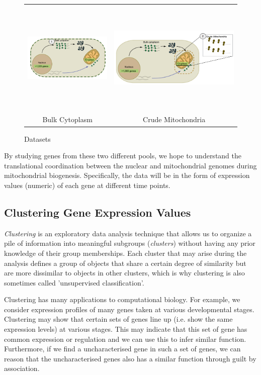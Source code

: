 \begin{figure}[H]
	\centering
	\renewcommand{\arraystretch}{0.5}
	\begin{tabular}{cc}
		\includegraphics[width=55mm,height=35mm]{Figures/bulk.png} &
		\includegraphics[width=85mm,height=55mm]{Figures/crude_mitochondria.png} \\
		Bulk Cytoplasm & Crude Mitochondria
	\end{tabular}
	\caption{Datasets}
	\label{fig: Datasets}
\end{figure}
By studying genes from these two different pools, we hope to understand the translational coordination between the nuclear and mitochondrial genomes during mitochondrial biogenesis. Specifically, the data will be in the form of expression values (numeric) of each gene at different time points.

\subsection{Clustering Gene Expression Values}
\textit{Clustering} is an exploratory data analysis technique that allows us to organize a pile of information into meaningful subgroups (\textit{clusters}) without having any prior knowledge of their group memberships. Each cluster that may arise during the analysis defines a group of objects that share a certain degree of similarity but are more dissimilar to objects in other clusters, which is why clustering is also sometimes called 'unsupervised classification'.

Clustering has many applications to computational biology. For example, we consider expression profiles of many genes taken at various developmental stages. Clustering may show that certain sets of genes line up (i.e. show the same expression levels) at various stages. This may indicate that this set of gene has common expression or regulation and we can use this to infer similar function. Furthermore, if we find a uncharacterised gene in such a set of genes, we can reason that the uncharacterised genes also has a similar function through guilt by association. 

